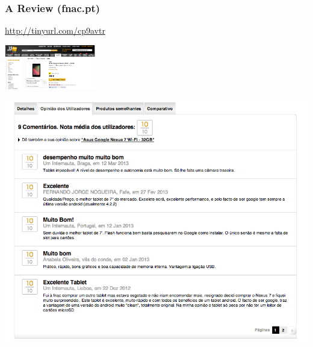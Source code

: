 \documentclass[t]{beamer}
\begin{document}
\begin{frame} \frametitle{A Review (fnac.pt)} %

\begin{block}{\url{http://tinyurl.com/cp9avtr}} 


\begin{center}
     \includegraphics[width=0.3\textwidth]{fnac-review1}
\end{center}

\begin{center}
     \includegraphics[width=\textwidth]{fnac-review2}
\end{center}

\end{block}


\end{frame} 
\end{document}
